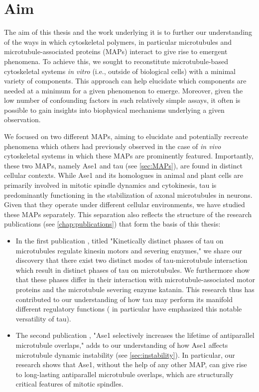 \chapter{Aim}
The aim of this thesis and the work underlying it is to further our understanding of the ways in which cytoskeletal polymers, in particular microtubules and microtubule-associated proteins (MAPs) interact to give rise to emergent phenomena. To achieve this, we sought to reconstitute microtubule-based cytoskeletal systems \textit{in vitro} (i.e., outside of biological cells) with a minimal variety of components. This approach can help elucidate which components are needed at a minimum for a given phenomenon to emerge. Moreover, given the low number of confounding factors in such relatively simple assays, it often is possible to gain insights into biophysical mechanisms underlying a given observation. \par
We focused on two different MAPs, aiming to elucidate and potentially recreate phenomena which others had previously observed in the case of \textit{in vivo} cytoskeletal systems in which these MAPs are prominently featured. Importantly, these two MAPs, namely Ase1 and tau (see \autoref{sec:MAPs}), are found in distinct cellular contexts. While Ase1 and its homologues in animal and plant cells are primarily involved in mitotic spindle dynamics and cytokinesis, tau is predominantly functioning in the stabilization of axonal microtubules in neurons. Given that they operate under different cellular environments, we have studied these MAPs separately. This separation also reflects the structure of the research publications (see \autoref{chap:publications}) that form the basis of this thesis:
\begin{itemize}
    \item In the first publication \parencite{Siahaan2019a}, titled "Kinetically distinct phases of tau on microtubules regulate kinesin motors and severing enzymes," we share our discovery that there exist two distinct modes of tau-microtubule interaction which result in distinct phases of tau on microtubules. We furthermore show that these phases differ in their interaction with microtubule-associated motor proteins and the microtubule severing enzyme katanin. This research thus has contributed to our understanding of how tau may perform its manifold different regulatory functions (\cite{Morris2011b} in particular have emphasized this notable versatility of tau).
    \item The second publication \parencite{Krattenmacher2024}, "Ase1 selectively increases the lifetime of antiparallel microtubule overlaps," adds to our understanding of how Ase1 affects microtubule dynamic instability (see \autoref{sec:instability}). In particular, our research shows that Ase1, without the help of any other MAP, can give rise to long-lasting antiparallel microtubule overlaps, which are structurally critical features of mitotic spindles.
\end{itemize}
